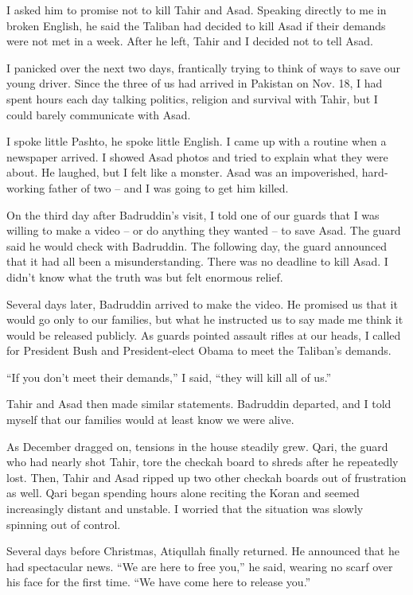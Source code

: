 ﻿\documentclass[12pt]{article}
\begin{document}
I asked him to promise not to kill Tahir and Asad. Speaking directly to me in broken English, he
said the Taliban had decided to kill Asad if their demands were not met in a week. After he left,
Tahir and I decided not to tell Asad.

I panicked over the next two days, frantically trying to think of ways to save our young driver.
Since the three of us had arrived in Pakistan on Nov. 18, I had spent hours each day talking
politics, religion and survival with Tahir, but I could barely communicate with Asad.

I spoke little Pashto, he spoke little English. I came up with a routine when a newspaper arrived. I
showed Asad photos and tried to explain what they were about. He laughed, but I felt like a monster.
Asad was an impoverished, hard-working father of two -- and I was going to get him killed.

On the third day after Badruddin's visit, I told one of our guards that I was willing to make a
video -- or do anything they wanted -- to save Asad. The guard said he would check with Badruddin.
The following day, the guard announced that it had all been a misunderstanding. There was no
deadline to kill Asad. I didn't know what the truth was but felt enormous relief.

Several days later, Badruddin arrived to make the video. He promised us that it would go only to our
families, but what he instructed us to say made me think it would be released publicly. As guards
pointed assault rifles at our heads, I called for President Bush and President-elect Obama to meet
the Taliban's demands.

``If you don't meet their demands,'' I said, ``they will kill all of us.''

Tahir and Asad then made similar statements. Badruddin departed, and I told myself that our families
would at least know we were alive.

As December dragged on, tensions in the house steadily grew. Qari, the guard who had nearly shot
Tahir, tore the checkah board to shreds after he repeatedly lost. Then, Tahir and Asad ripped up two
other checkah boards out of frustration as well. Qari began spending hours alone reciting the Koran
and seemed increasingly distant and unstable. I worried that the situation was slowly spinning out
of control.

Several days before Christmas, Atiqullah finally returned. He announced that he had spectacular
news. ``We are here to free you,'' he said, wearing no scarf over his face for the first time. ``We
have come here to release you.''
\end{document}
